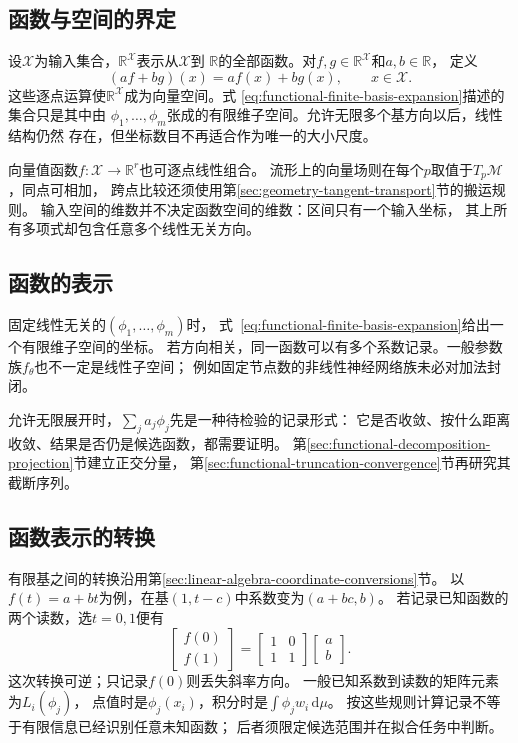 \subsection{函数与空间的界定}
\label{sec:functional-objects}

设$\mathcal{X}$为输入集合，$\mathbb{R}^{\mathcal{X}}$表示从$\mathcal{X}$到
$\mathbb{R}$的全部函数。对$f,g\in\mathbb{R}^{\mathcal{X}}$和$a,b\in\mathbb{R}$，
定义
\[
  (af+bg)(x)=af(x)+bg(x),\qquad x\in\mathcal{X}.
\]
这些逐点运算使$\mathbb{R}^{\mathcal{X}}$成为向量空间。式
\eqref{eq:functional-finite-basis-expansion}描述的集合只是其中由
$\phi_1,\ldots,\phi_m$张成的有限维子空间。允许无限多个基方向以后，线性结构仍然
存在，但坐标数目不再适合作为唯一的大小尺度。



向量值函数$f:\mathcal X\to\mathbb R^r$也可逐点线性组合。
流形上的向量场则在每个$p$取值于$T_p\mathcal M$，同点可相加，
跨点比较还须使用第\ref{sec:geometry-tangent-transport}节的搬运规则。
输入空间的维数并不决定函数空间的维数：区间只有一个输入坐标，
其上所有多项式却包含任意多个线性无关方向。

\subsection{函数的表示}
\label{sec:functional-representations}

固定线性无关的$(\phi_1,\ldots,\phi_m)$时，
式~\eqref{eq:functional-finite-basis-expansion}给出一个有限维子空间的坐标。
若方向相关，同一函数可以有多个系数记录。一般参数族$f_\theta$也不一定是线性子空间；
例如固定节点数的非线性神经网络族未必对加法封闭。

允许无限展开时，$\sum_j a_j\phi_j$先是一种待检验的记录形式：
它是否收敛、按什么距离收敛、结果是否仍是候选函数，都需要证明。
第\ref{sec:functional-decomposition-projection}节建立正交分量，
第\ref{sec:functional-truncation-convergence}节再研究其截断序列。

\subsection{函数表示的转换}
\label{sec:functional-representation-conversions}

有限基之间的转换沿用第\ref{sec:linear-algebra-coordinate-conversions}节。
以$f(t)=a+bt$为例，在基$(1,t-c)$中系数变为$(a+bc,b)$。
若记录已知函数的两个读数，选$t=0,1$便有
\[
 \begin{bmatrix}f(0)\\f(1)\end{bmatrix}
 =\begin{bmatrix}1&0\\1&1\end{bmatrix}\begin{bmatrix}a\\b\end{bmatrix}.
\]
这次转换可逆；只记录$f(0)$则丢失斜率方向。
一般已知系数到读数的矩阵元素为$L_i(\phi_j)$，
点值时是$\phi_j(x_i)$，积分时是$\int\phi_jw_i\,\mathrm d\mu$。
按这些规则计算记录不等于有限信息已经识别任意未知函数；
后者须限定候选范围并在拟合任务中判断。


